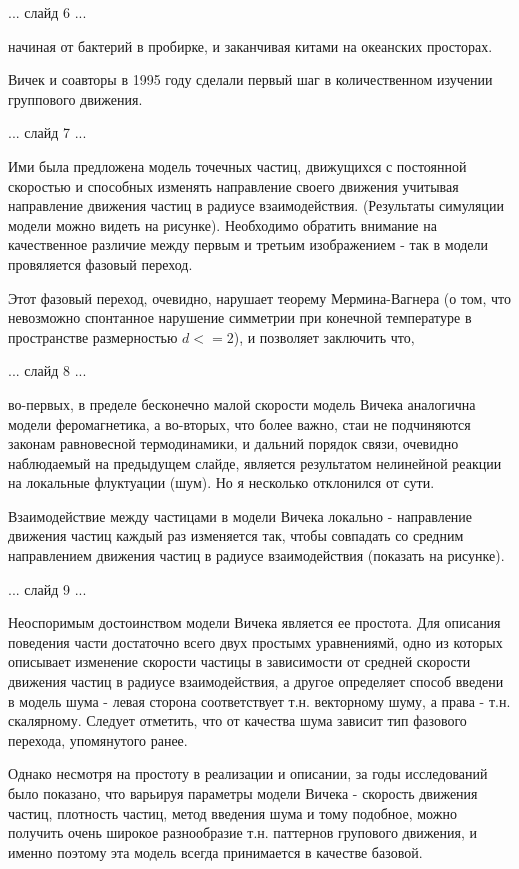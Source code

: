 \documentclass[a4paper,14pt,russian]{extreport}
\begin{document}
  ... слайд 6 ...

  начиная от бактерий в пробирке, и заканчивая китами на океанских просторах.
  
  Вичек и соавторы в 1995 году сделали первый шаг в количественном изучении группового движения.

  ... слайд 7 ...

  Ими была предложена модель точечных частиц, движущихся с постоянной скоростью и способных изменять направление своего движения учитывая направление движения частиц в радиусе взаимодействия. (Результаты симуляции модели можно видеть на рисунке). Необходимо обратить внимание на качественное различие между первым и третьим изображением - так в модели провяляется фазовый переход.

  Этот фазовый переход, очевидно, нарушает теорему Мермина-Вагнера (о том, что невозможно спонтанное нарушение симметрии при конечной температуре в пространстве размерностью $d <= 2$), и позволяет заключить что, 

  ... слайд 8 ...

  во-первых, в пределе бесконечно малой скорости модель Вичека аналогична модели феромагнетика, а во-вторых, что более важно, стаи не подчиняются законам равновесной термодинамики, и дальний порядок связи, очевидно наблюдаемый на предыдущем слайде, является результатом нелинейной реакции на локальные флуктуации (шум). Но я несколько отклонился от сути.

  Взаимодействие между частицами в модели Вичека локально - направление движения частиц каждый раз изменяется так, чтобы совпадать со средним направлением движения частиц в радиусе взаимодействия (показать на рисунке).


  ... слайд 9 ...

  Неоспоримым достоинством модели Вичека является ее простота. Для описания поведения части достаточно всего двух простымх уравнениямй, одно из которых описывает изменение скорости частицы в зависимости от средней скорости движения частиц в радиусе взаимодействия, а другое определяет способ введени в модель шума - левая сторона соответствует т.н. векторному шуму, а права - т.н. скалярному. Следует отметить, что от качества шума зависит тип фазового перехода, упомянутого ранее.

  Однако несмотря на простоту в реализации и описании, за годы исследований было показано, что варьируя параметры модели Вичека - скорость движения частиц, плотность частиц, метод введения шума и тому подобное, можно получить очень широкое разнообразие т.н. паттернов групового движения, и именно поэтому эта модель всегда принимается в качестве базовой.
\end{document}
